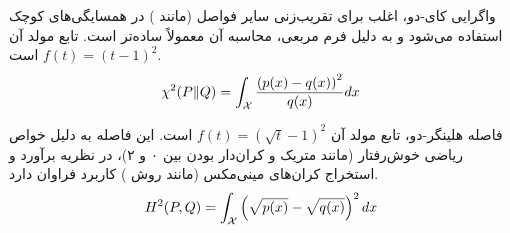 \begin{تعریف}[کای-دو]
\label{def:chi2}
واگرایی کای-دو،
 اغلب برای تقریب‌زنی سایر فواصل (مانند ) در همسایگی‌های کوچک استفاده می‌شود و به دلیل فرم مربعی، محاسبه آن معمولاً ساده‌تر است.
 تابع مولد آن $f(t) = (t-1)^2$ است.
\begin{equation}
\chi^2(P \| Q) = \int_{\Xset} \frac{\left(p(x) - q(x)\right)^2}{q(x)} dx
\end{equation}
\end{تعریف}

\begin{تعریف}[هلینگر-دو]
\label{def:hellinger}
فاصله هلینگر-دو،
تابع مولد آن $f(t) = (\sqrt{t}-1)^2$ است. این فاصله به دلیل خواص ریاضی خوش‌رفتار (مانند متریک و کران‌دار بودن بین ۰ و ۲)، در نظریه برآورد و استخراج کران‌های مینی‌مکس (مانند روش ) کاربرد فراوان دارد.
\begin{equation}
H^2(P, Q) = \int_{\Xset} \left(\sqrt{p(x)} - \sqrt{q(x)}\right)^2 dx
\end{equation}
\end{تعریف}

